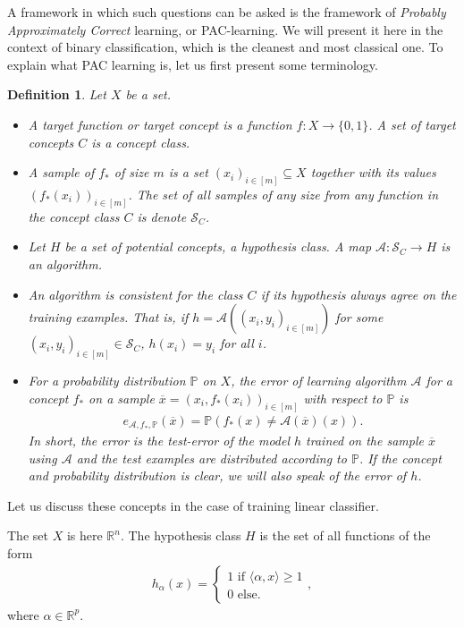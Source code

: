 \documentclass{article}
\newcommand{\calA}{\mathcal{A}}
\newcommand{\sprod}[1]{\langle #1 \rangle}
\newcommand{\calS}{\mathcal{S}}
\newcommand{\R}{\mathbb{R}}
\newcommand{\sse}{\subseteq}
\newtheorem{defi}{Definition}
\begin{document}
A framework in which such questions can be asked is the framework of \emph{Probably Approximately Correct} learning, or PAC-learning.
We will present it here in the context of binary classification, which is the cleanest and most classical one. To explain what PAC learning is, let us first present some terminology.
\begin{defi}
    Let $X$ be a set. 
    \begin{itemize}
        \item A \emph{target function} or \emph{target concept} is a function $f:X \to \{0,1\}$. A set of target concepts $C$ is a \emph{concept class}. 

        \item A \emph{sample of $f_*$} of size $m$ is a set $(x_i)_{i \in [m]}\sse X$ together with its values $(f_*(x_i))_{i \in [m]}$. The set of all samples of any size from any function in the concept class $C$ is denote $\calS_C$.

        \item Let $H$ be a set of potential concepts, a \emph{hypothesis class}. A map $\calA : \calS_C \to H$ is an \emph{algorithm}.

        \item An algorithm is \emph{consistent for the class $C$} if its hypothesis always agree on the training examples. That is, if $h= \calA((x_i,y_i)_{i \in [m]})$ for some $(x_i,y_i)_{i \in [m]} \in \calS_C$,  $h(x_i)=y_i$ for all $i$.

        \item For a probability distribution $\mathbb{P}$ on $X$, the \emph{error of learning algorithm $\calA$ for a concept $f_*$ on a sample $\overline{x} = (x_i,f_*(x_i))_{i \in [m]}$ with respect to $\mathbb{P}$} is
        \begin{align*}
            e_{\calA,f_*,\mathbb{P}}(\overline{x}) = \mathbb{P}(f_*(x)\neq \calA(\overline{x})(x)).
        \end{align*}
        In short, the error is the test-error of the model $h$ trained on the sample $\overline{x}$ using $\calA$ and the test examples are distributed according to $\mathbb{P}$. If the concept and probability distribution is clear, we will also speak of the \emph{error of $h$}. 
    \end{itemize}
\end{defi}
    Let us discuss these concepts in the case of training linear classifier.

    The set $X$ is here $\R^n$. The hypothesis class $H$ is the set of all functions of the form
    \begin{align*}
        h_{\alpha}(x) = \begin{cases}
            1 \text{ if } \sprod{\alpha,x} \geq 1  \\
            0 \text{ else}.
        \end{cases},
    \end{align*}
    where $\alpha\in \R^p$.
\end{document}
